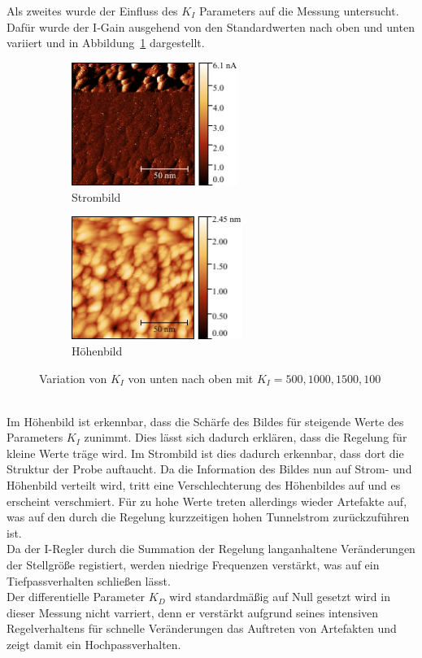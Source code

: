 \documentclass[a4paper,twoside,final]{article}
\begin{document}
Als zweites wurde der Einfluss des $K_I$ Parameters auf die Messung untersucht. Dafür wurde der I-Gain ausgehend von den Standardwerten nach oben und unten variiert und in Abbildung~\ref{fig:IGlied} dargestellt.
\begin{figure}[htp]
    \centering
    \begin{subfigure}{0.45\textwidth}
        \includegraphics[height=4cm]{Bilder/Image01980_IGain_Strom.pdf}
        \caption{Strombild}
    \end{subfigure}
    \hspace{0.5cm}
    \begin{subfigure}{0.45\textwidth}
        \includegraphics[height=4cm]{Bilder/Image01980_IGain.pdf}
        \caption{Höhenbild}
    \end{subfigure}
    \caption{Variation von $K_I$ von unten nach oben mit $K_I = 500, 1000, 1500, 100$}
    \label{fig:IGlied}
\end{figure}\\
Im Höhenbild ist erkennbar, dass die Schärfe des Bildes für steigende Werte des Parameters $K_I$ zunimmt. Dies lässt sich dadurch erklären, dass die Regelung für kleine Werte träge wird. Im Strombild ist dies dadurch erkennbar, dass dort die Struktur der Probe auftaucht. Da die Information des Bildes nun auf Strom- und Höhenbild verteilt wird, tritt eine Verschlechterung des Höhenbildes auf und es erscheint verschmiert. Für zu hohe Werte treten allerdings wieder Artefakte auf, was auf den durch die Regelung kurzzeitigen hohen Tunnelstrom zurückzuführen ist.\\
Da der I-Regler durch die Summation der Regelung langanhaltene Veränderungen der Stellgröße registiert, werden niedrige Frequenzen verstärkt, was auf ein Tiefpassverhalten schließen lässt.\\
Der differentielle Parameter $K_D$ wird standardmäßig auf Null gesetzt wird in dieser Messung nicht varriert, denn er verstärkt aufgrund seines intensiven Regelverhaltens für schnelle Veränderungen das Auftreten von Artefakten und zeigt damit ein Hochpassverhalten.
\end{document}
